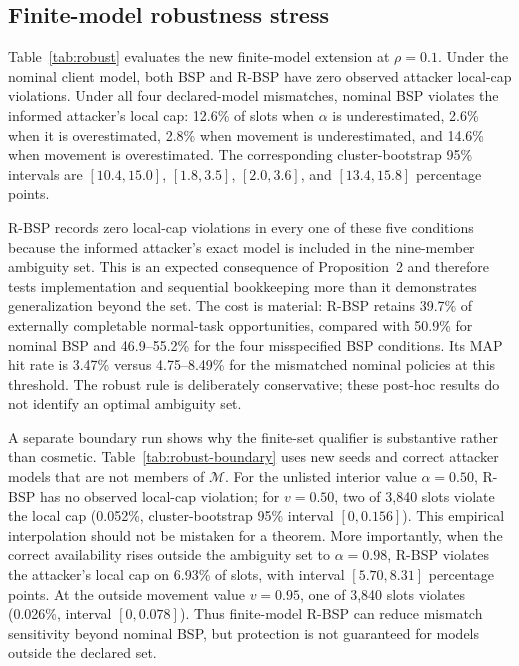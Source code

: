 \documentclass[review,12pt]{elsarticle}
\begin{document}
\subsection{Finite-model robustness stress}
Table~\ref{tab:robust} evaluates the new finite-model extension at $\rho=0.1$. Under the nominal client model, both BSP and R-BSP have zero observed attacker local-cap violations. Under all four declared-model mismatches, nominal BSP violates the informed attacker's local cap: 12.6\% of slots when $\alpha$ is underestimated, 2.6\% when it is overestimated, 2.8\% when movement is underestimated, and 14.6\% when movement is overestimated. The corresponding cluster-bootstrap 95\% intervals are $[10.4,15.0]$, $[1.8,3.5]$, $[2.0,3.6]$, and $[13.4,15.8]$ percentage points.

R-BSP records zero local-cap violations in every one of these five conditions because the informed attacker's exact model is included in the nine-member ambiguity set. This is an expected consequence of Proposition~2 and therefore tests implementation and sequential bookkeeping more than it demonstrates generalization beyond the set. The cost is material: R-BSP retains 39.7\% of externally completable normal-task opportunities, compared with 50.9\% for nominal BSP and 46.9--55.2\% for the four misspecified BSP conditions. Its MAP hit rate is 3.47\% versus 4.75--8.49\% for the mismatched nominal policies at this threshold. The robust rule is deliberately conservative; these post-hoc results do not identify an optimal ambiguity set.

\begin{table}[tbp]
\centering\small
\caption{Post-hoc finite-model stress at $\rho=0.1$, 20 synthetic seed clusters and 80 trajectories per row. Viol. is the fraction of 3,840 slot-level outputs per condition for which the informed attacker's posterior exceeds its own local cap. R-BSP contains the attacker's exact $(v,\alpha)=(0.3,0.648)$ model. Retention is Eq.~\eqref{eq:utility}.}
\label{tab:robust}
\end{table}

A separate boundary run shows why the finite-set qualifier is substantive rather than cosmetic. Table~\ref{tab:robust-boundary} uses new seeds and correct attacker models that are not members of $\mathcal M$. For the unlisted interior value $\alpha=0.50$, R-BSP has no observed local-cap violation; for $v=0.50$, two of 3,840 slots violate the local cap (0.052\%, cluster-bootstrap 95\% interval $[0,0.156]$). This empirical interpolation should not be mistaken for a theorem. More importantly, when the correct availability rises outside the ambiguity set to $\alpha=0.98$, R-BSP violates the attacker's local cap on 6.93\% of slots, with interval $[5.70,8.31]$ percentage points. At the outside movement value $v=0.95$, one of 3,840 slots violates (0.026\%, interval $[0,0.078]$). Thus finite-model R-BSP can reduce mismatch sensitivity beyond nominal BSP, but protection is not guaranteed for models outside the declared set.
\end{document}

